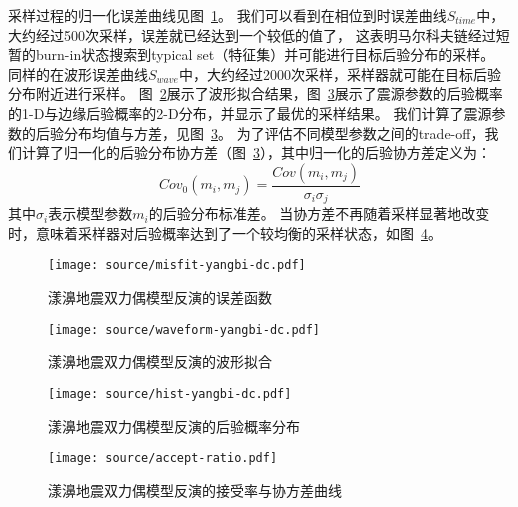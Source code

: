 采样过程的归一化误差曲线见图~\ref{fig:misfit-yangbi-dc}。
我们可以看到在相位到时误差曲线$S_{time}$中，大约经过500次采样，误差就已经达到一个较低的值了，
这表明马尔科夫链经过短暂的burn-in状态搜索到typical set（特征集）并可能进行目标后验分布的采样。
同样的在波形误差曲线$S_{wave}$中，大约经过2000次采样，采样器就可能在目标后验分布附近进行采样。
图~\ref{fig:waveform-yangbi-dc}展示了波形拟合结果，图~\ref{fig:hist-yangbi-dc}展示了震源参数的后验概率的1-D与边缘后验概率的2-D分布，并显示了最优的采样结果。
我们计算了震源参数的后验分布均值与方差，见图~\ref{fig:hist-yangbi-dc}。
为了评估不同模型参数之间的trade-off，我们计算了归一化的后验分布协方差（图~\ref{fig:hist-yangbi-dc}），其中归一化的后验协方差定义为：
\begin{equation}
    Cov_0(m_i,m_j) = \frac {Cov(m_i,m_j)} {\sigma_i \sigma_j}
\end{equation}
其中$\sigma_i$表示模型参数$m_i$的后验分布标准差。
当协方差不再随着采样显著地改变时，意味着采样器对后验概率达到了一个较均衡的采样状态，如图~\ref{fig:accept-ratio}。

\begin{figure}[h]
    \centering
    \texttt{[image: source/misfit-yangbi-dc.pdf]}
    \caption{漾濞地震双力偶模型反演的误差函数}
    \label{fig:misfit-yangbi-dc}
\end{figure}

\begin{figure}[h]
    \centering
    \texttt{[image: source/waveform-yangbi-dc.pdf]}
    \caption{漾濞地震双力偶模型反演的波形拟合}
    \label{fig:waveform-yangbi-dc}
\end{figure}

\begin{figure}[h]
    \centering
    \texttt{[image: source/hist-yangbi-dc.pdf]}
    \caption{漾濞地震双力偶模型反演的后验概率分布}
    \label{fig:hist-yangbi-dc}
\end{figure}

\begin{figure}[h]
    \centering
    \texttt{[image: source/accept-ratio.pdf]}
    \caption{漾濞地震双力偶模型反演的接受率与协方差曲线}
    \label{fig:accept-ratio}
\end{figure}

